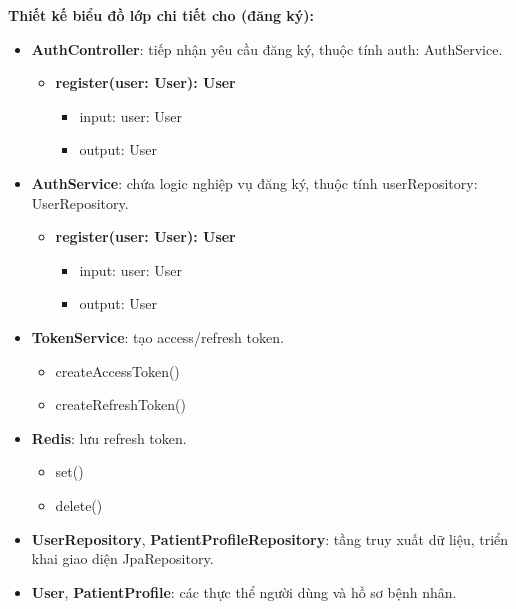 \textbf{Thiết kế biểu đồ lớp chi tiết cho  (đăng ký):}
\begin{itemize}[label=\textbullet, itemsep=0.4em]
  \item \textbf{AuthController}: tiếp nhận yêu cầu đăng ký, thuộc tính auth: AuthService.
  \begin{itemize}[label=$\circ$, itemsep=0.2em, leftmargin=1.5em]
    \item \textbf{register(user: User): User}
    \begin{itemize}[label=$\blacksquare$, itemsep=0.1em, leftmargin=1.5em]
      \item input: user: User
      \item output: User
    \end{itemize}
  \end{itemize}
  \item \textbf{AuthService}: chứa logic nghiệp vụ đăng ký, thuộc tính userRepository: UserRepository.
  \begin{itemize}[label=$\circ$, itemsep=0.2em, leftmargin=1.5em]
    \item \textbf{register(user: User): User}
    \begin{itemize}[label=$\blacksquare$, itemsep=0.1em, leftmargin=1.5em]
      \item input: user: User
      \item output: User
    \end{itemize}
  \end{itemize}
  \item \textbf{TokenService}: tạo access/refresh token.
  \begin{itemize}[label=$\circ$, itemsep=0.2em, leftmargin=1.5em]
    \item createAccessToken()
    \item createRefreshToken()
  \end{itemize}
  \item \textbf{Redis}: lưu refresh token.
  \begin{itemize}[label=$\circ$, itemsep=0.2em, leftmargin=1.5em]
    \item set()
    \item delete()
  \end{itemize}
  \item \textbf{UserRepository}, \textbf{PatientProfileRepository}: tầng truy xuất dữ liệu, triển khai giao diện JpaRepository.
  \item \textbf{User}, \textbf{PatientProfile}: các thực thể người dùng và hồ sơ bệnh nhân.
\end{itemize}

